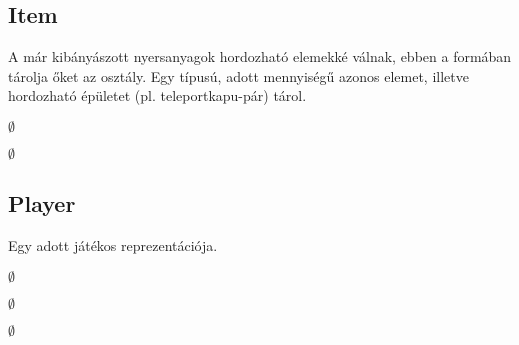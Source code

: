 \subsection{Item}
\begin{class-template-responsibility}
A már kibányászott nyersanyagok hordozható elemekké válnak, ebben a formában tárolja őket az osztály. Egy típusú, adott mennyiségű azonos elemet, illetve hordozható épületet (pl. teleportkapu-pár) tárol.
\end{class-template-responsibility}
\begin{class-template-interface}
$\emptyset$
\end{class-template-interface}
\begin{class-template-baseclass}
$\emptyset$
\end{class-template-baseclass}
\begin{class-template-attribute}
\end{class-template-attribute}
\begin{class-template-method}
\end{class-template-method}


\subsection{Player}
\begin{class-template-responsibility}
Egy adott játékos reprezentációja. 
\end{class-template-responsibility}
\begin{class-template-interface}
$\emptyset$
\end{class-template-interface}
\begin{class-template-baseclass}
$\emptyset$
\end{class-template-baseclass}
\begin{class-template-attribute}
\end{class-template-attribute}
\begin{class-template-method}
\item[] $\emptyset$
\end{class-template-method}


